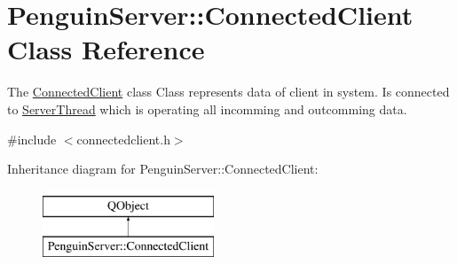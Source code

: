 \hypertarget{classPenguinServer_1_1ConnectedClient}{\section{Penguin\-Server\-:\-:Connected\-Client Class Reference}
\label{classPenguinServer_1_1ConnectedClient}
}


The \hyperlink{classPenguinServer_1_1ConnectedClient}{Connected\-Client} class Class represents data of client in system. Is connected to \hyperlink{classPenguinServer_1_1ServerThread}{Server\-Thread} which is operating all incomming and outcomming data.  




{\ttfamily \#include $<$connectedclient.\-h$>$}

Inheritance diagram for Penguin\-Server\-:\-:Connected\-Client\-:\begin{figure}[H]
\begin{center}
\leavevmode
\includegraphics[height=2.000000cm]{classPenguinServer_1_1ConnectedClient}
\end{center}
\end{figure}
